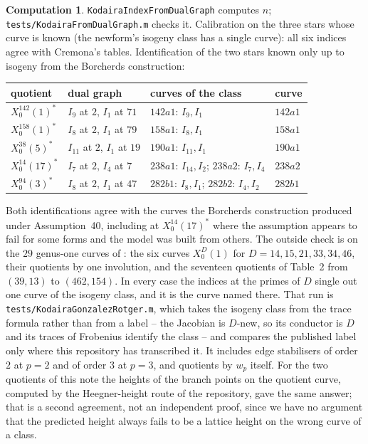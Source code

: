 \documentclass[11pt,reqno]{amsart}
\theoremstyle{plain}
\theoremstyle{definition}
\newtheorem{computation}[theorem]{Computation}
\begin{document}
\begin{computation}
\texttt{KodairaIndexFromDualGraph} computes $n$; \texttt{tests/KodairaFromDualGraph.m} checks it.
Calibration on the three stars whose curve is known (the newform's isogeny class has a single
curve): all six indices agree with Cremona's tables. Identification of the two stars known only up
to isogeny from the Borcherds construction:
\begin{center}
\begin{tabular}{llll}
\toprule
quotient & dual graph & curves of the class & curve \\
\midrule
$X_0^{142}(1)^*$ & $I_9$ at $2$, $I_1$ at $71$ & $142a1$: $I_9, I_1$ & $142a1$ \\
$X_0^{158}(1)^*$ & $I_8$ at $2$, $I_1$ at $79$ & $158a1$: $I_8, I_1$ & $158a1$ \\
$X_0^{38}(5)^*$ & $I_{11}$ at $2$, $I_1$ at $19$ & $190a1$: $I_{11}, I_1$ & $190a1$ \\
$X_0^{14}(17)^*$ & $I_7$ at $2$, $I_4$ at $7$ & $238a1$: $I_{14}, I_2$; $238a2$: $I_7, I_4$ & $238a2$ \\
$X_0^{94}(3)^*$ & $I_8$ at $2$, $I_1$ at $47$ & $282b1$: $I_8, I_1$; $282b2$: $I_4, I_2$ & $282b1$ \\
\bottomrule
\end{tabular}
\end{center}
Both identifications agree with the curves the Borcherds construction produced under
Assumption~40, including at $X_0^{14}(17)^*$ where the assumption appears to fail for some forms and
the model was built from others. The outside check is on the $29$ genus-one curves of \cite{GR}:
the six curves $X_0^D(1)$ for $D = 14, 15, 21, 33, 34, 46$, their quotients by one involution, and
the seventeen quotients of Table~2 from $(39,13)$ to $(462,154)$. In every case the indices at the
primes of $D$ single out one curve of the isogeny class, and it is the curve named there. That run
is \texttt{tests/KodairaGonzalezRotger.m}, which takes the isogeny class from the trace formula
rather than from a label -- the Jacobian is $D$-new, so its conductor is $D$ and its traces of
Frobenius identify the class -- and compares the published label only where this repository has
transcribed it. It includes edge stabilisers of order $2$ at $p = 2$ and of order $3$ at $p = 3$, and
quotients by $w_p$ itself. For the two quotients of this note the heights of the branch points on
the quotient curve, computed by the Heegner-height route of the repository, gave the same answer;
that is a second agreement, not an independent proof, since we have no argument that the predicted
height always fails to be a lattice height on the wrong curve of a class.
\end{computation}
\end{document}
